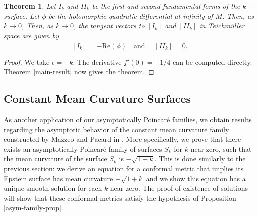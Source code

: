 \documentclass{amsart}
\newtheorem{thm}{Theorem}[section]
\newcommand{\two}{I\!\!I}
\begin{document}
\begin{thm} \label{labourie-conjecture-proof}
Let $I_k$ and $\two_k$ be the first and second fundamental forms of the $k$-surface. 
Let $\phi$ be the holomorphic quadratic differential at infinity of $M$. 
Then, as $k \to 0$, Then, as $k \to 0$, the tangent vectors to $[I_k]$ and $[\two_k]$ in Teichm\"uller space are given by 
\[
\dot{[I_k]} = - \mathrm{Re}(\phi) \quad \text{and } \quad   \dot{[\two_k]} = 0.
\]
\end{thm}

\begin{proof}
We take $\epsilon = -k$. 
The derivative $f'(0) = -1/4$ can be computed directly. 
Theorem \ref{main-result} now gives the theorem.
\end{proof}



\subsection{Constant Mean Curvature Surfaces}



As another application of our asymptotically Poincar\'e families, we obtain results regarding the asymptotic behavior of the constant mean curvature family constructed by Mazzeo and Pacard in \cite{mazzeo-pacard2011}. 
More specifically, we prove that there exists an asymptotically Poincar\'e family of surfaces $S_k$ for $k$ near zero, such that the mean curvature of the surface $S_k$ is $-\sqrt{1+k}$. 
This is done similarly to the previous section: we derive an equation for a conformal metric that implies its Epstein surface has mean curvature $-\sqrt{1+k}$ and we show this equation has a unique smooth solution for each $k$ near zero. 
The proof of existence of solutions will show that these conformal metrics satisfy the hypothesis of Proposition \ref{asym-family-prop}.
\end{document}

